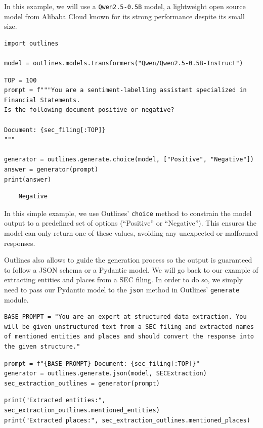 In this example, we will use a \texttt{Qwen2.5-0.5B} model, a lightweight open source model from Alibaba Cloud known for its strong performance despite its small size.

\begin{verbatim}
import outlines

model = outlines.models.transformers("Qwen/Qwen2.5-0.5B-Instruct")
\end{verbatim}

\begin{verbatim}
TOP = 100
prompt = f"""You are a sentiment-labelling assistant specialized in Financial Statements.
Is the following document positive or negative?

Document: {sec_filing[:TOP]}
"""

generator = outlines.generate.choice(model, ["Positive", "Negative"])
answer = generator(prompt)
print(answer)
\end{verbatim}

\begin{verbatim}
    Negative
\end{verbatim}

In this simple example, we use Outlines' \texttt{choice} method to constrain the model output to a predefined set of options (``Positive'' or ``Negative''). This ensures the model can only return one of these values, avoiding any unexpected or malformed responses.

Outlines also allows to guide the generation process so the output is guaranteed to follow a JSON schema or a Pydantic model. We will go back to our example of extracting entities and places from a SEC filing. In order to do so, we simply need to pass our Pydantic model to the \texttt{json} method in Outlines' \texttt{generate} module.

\begin{verbatim}
BASE_PROMPT = "You are an expert at structured data extraction. You will be given unstructured text from a SEC filing and extracted names of mentioned entities and places and should convert the response into the given structure."
\end{verbatim}

\begin{verbatim}
prompt = f"{BASE_PROMPT} Document: {sec_filing[:TOP]}"
generator = outlines.generate.json(model, SECExtraction)
sec_extraction_outlines = generator(prompt)
\end{verbatim}

\begin{verbatim}
print("Extracted entities:", sec_extraction_outlines.mentioned_entities)
print("Extracted places:", sec_extraction_outlines.mentioned_places)
\end{verbatim}

